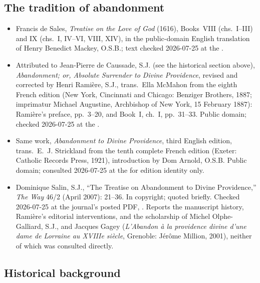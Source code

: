 \subsection*{The tradition of abandonment}

{\fontsize{8.6}{9.6}\selectfont
\begin{itemize}[itemsep=0pt,parsep=0pt,topsep=0.05em]
\item Francis de Sales, \emph{Treatise on the Love of God} (1616), Books~VIII (chs.~I--III) and IX (chs.~I, IV--VI, VIII, XIV), in the public-domain English translation of Henry Benedict Mackey, O.S.B.; text checked 2026-07-25 at the .
\item Attributed to Jean-Pierre de Caussade, S.J. (see the historical section above), \emph{Abandonment; or, Absolute Surrender to Divine Providence}, revised and corrected by Henri Ramière, S.J., trans.\ Ella McMahon from the eighth French edition (New York, Cincinnati and Chicago: Benziger Brothers, 1887; imprimatur Michael Augustine, Archbishop of New York, 15 February 1887): Ramière's preface, pp.~3--20, and Book~I, ch.~I, pp.~31--33. Public domain; checked 2026-07-25 at the .
\item Same work, \emph{Abandonment to Divine Providence}, third English edition, trans.\ E.~J. Strickland from the tenth complete French edition (Exeter: Catholic Records Press, 1921), introduction by Dom Arnold, O.S.B. Public domain; consulted 2026-07-25 at the  for edition identity only.
\item Dominique Salin, S.J., ``The Treatise on Abandonment to Divine Providence,'' \emph{The Way} 46/2 (April 2007): 21--36. In copyright; quoted briefly. Checked 2026-07-25 at the journal's posted PDF, . Reports the manuscript history, Ramière's editorial interventions, and the scholarship of Michel Olphe-Galliard, S.J., and Jacques Gagey (\emph{L'Abandon à la providence divine d'une dame de Lorraine au XVIIIe siècle}, Grenoble: Jérôme Million, 2001), neither of which was consulted directly.
\end{itemize}}

\subsection*{Historical background}

